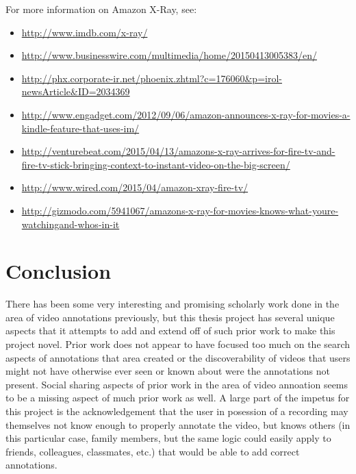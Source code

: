 For more information on Amazon X-Ray, see:
\begin{itemize}[noitemsep,leftmargin=*]
\item \url{http://www.imdb.com/x-ray/}
\item \url{http://www.businesswire.com/multimedia/home/20150413005383/en/}
\item \url{http://phx.corporate-ir.net/phoenix.zhtml?c=176060&p=irol-newsArticle&ID=2034369}
\item \url{http://www.engadget.com/2012/09/06/amazon-announces-x-ray-for-movies-a-kindle-feature-that-uses-im/}
\item \url{http://venturebeat.com/2015/04/13/amazons-x-ray-arrives-for-fire-tv-and-fire-tv-stick-bringing-context-to-instant-video-on-the-big-screen/}
\item \url{http://www.wired.com/2015/04/amazon-xray-fire-tv/}
\item \url{http://gizmodo.com/5941067/amazons-x-ray-for-movies-knows-what-youre-watchingand-whos-in-it}
\end{itemize}








\section{Conclusion}
\label{sec:priorwork:conclusion}

There has been some very interesting and promising scholarly work done in the area of video annotations previously, but this thesis project has several unique aspects that it attempts to add and extend off of such prior work to make this project novel. Prior work does not appear to have focused too much on the search aspects of annotations that area created or the discoverability of videos that users might not have otherwise ever seen or known about were the annotations not present.  Social sharing aspects of prior work in the area of video annoation seems to be a missing aspect of much prior work as well.  A large part of the impetus for this project is the acknowledgement that the user in posession of a recording may themselves not know enough to properly annotate the video, but knows others (in this particular case, family members, but the same logic could easily apply to friends, colleagues, classmates, etc.) that would be able to add correct annotations.

